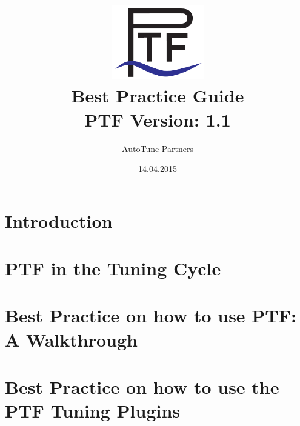 \documentclass[a4paper, 11pt]{article}
\begin{document}
\title{\includegraphics[width=4cm]{./images/Ptf_LogoBlau}\\ \vspace{1cm}
\textsf{\bf \huge Best Practice Guide }\\
       \normalsize PTF Version: 1.1\\
       }
\author{AutoTune Partners}
\date{14.04.2015}
\maketitle
\newpage
\tableofcontents

\newpage
\section{Introduction}

\label{sec:intro}

\clearpage

\section{PTF in the Tuning Cycle}
\label{sec:chapter2}

\clearpage

\section{Best Practice on how to use PTF: A Walkthrough}
\label{sec:chapter3}

\clearpage

\section{Best Practice on how to use the PTF Tuning Plugins}
\label{sec:chapter4}

\clearpage

{}

\end{document}
